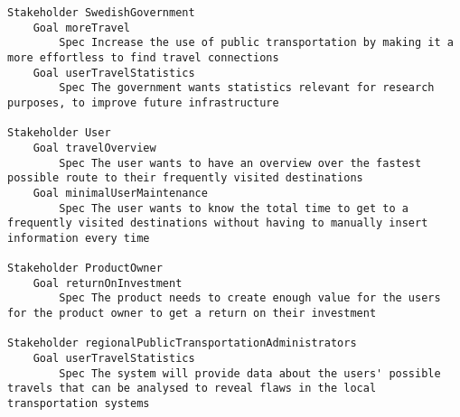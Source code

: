 

\begin{lstlisting}
Stakeholder SwedishGovernment
	Goal moreTravel
		Spec Increase the use of public transportation by making it a more effortless to find travel connections
	Goal userTravelStatistics
		Spec The government wants statistics relevant for research purposes, to improve future infrastructure

Stakeholder User
	Goal travelOverview
		Spec The user wants to have an overview over the fastest possible route to their frequently visited destinations
	Goal minimalUserMaintenance
		Spec The user wants to know the total time to get to a frequently visited destinations without having to manually insert information every time

Stakeholder ProductOwner
	Goal returnOnInvestment
		Spec The product needs to create enough value for the users for the product owner to get a return on their investment

Stakeholder regionalPublicTransportationAdministrators
	Goal userTravelStatistics
		Spec The system will provide data about the users' possible travels that can be analysed to reveal flaws in the local transportation systems

\end{lstlisting}
